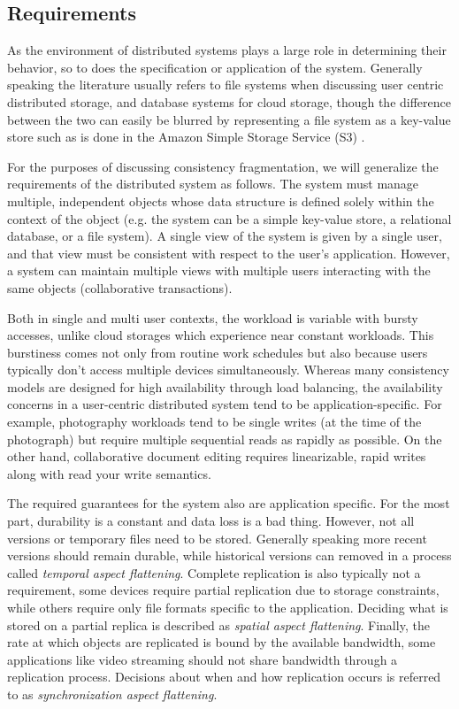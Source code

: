 \documentclass[letterpaper,twocolumn,10pt]{article}
\begin{document}
\subsection{Requirements}

As the environment of distributed systems plays a large role in determining their behavior, so to does the specification or application of the system. Generally speaking the literature usually refers to file systems when discussing user centric distributed storage, and database systems for cloud storage, though the difference between the two can easily be blurred by representing a file system as a key-value store such as is done in the Amazon Simple Storage Service (S3) \cite{bermbach_eventual_2011}.

For the purposes of discussing consistency fragmentation, we will generalize the requirements of the distributed system as follows. The system must manage multiple, independent objects whose data structure is defined solely within the context of the object (e.g. the system can be a simple key-value store, a relational database, or a file system). A single view of the system is given by a single user, and that view must be consistent with respect to the user's application. However, a system can maintain multiple views with multiple users interacting with the same objects (collaborative transactions).

Both in single and multi user contexts, the workload is variable with bursty accesses, unlike cloud storages which experience near constant workloads. This burstiness comes not only from routine work schedules but also because users typically don't access multiple devices simultaneously. Whereas many consistency models are designed for high availability through load balancing, the availability concerns in a user-centric distributed system tend to be application-specific. For example, photography workloads tend to be single writes (at the time of the photograph) but require multiple sequential reads as rapidly as possible. On the other hand, collaborative document editing requires linearizable, rapid writes along with read your write semantics.

The required guarantees for the system also are application specific. For the most part, durability is a constant and data loss is a bad thing. However, not all versions or temporary files need to be stored. Generally speaking more recent versions should remain durable, while historical versions can removed in a process called \textit{temporal aspect flattening}. Complete replication is also typically not a requirement, some devices require partial replication due to storage constraints, while others require only file formats specific to the application. Deciding what is stored on a partial replica is described as \textit{spatial aspect flattening}.  Finally, the rate at which objects are replicated is bound by the available bandwidth, some applications like video streaming should not share bandwidth through a replication process. Decisions about when and how replication occurs is referred to as \textit{synchronization aspect flattening}.
\end{document}
